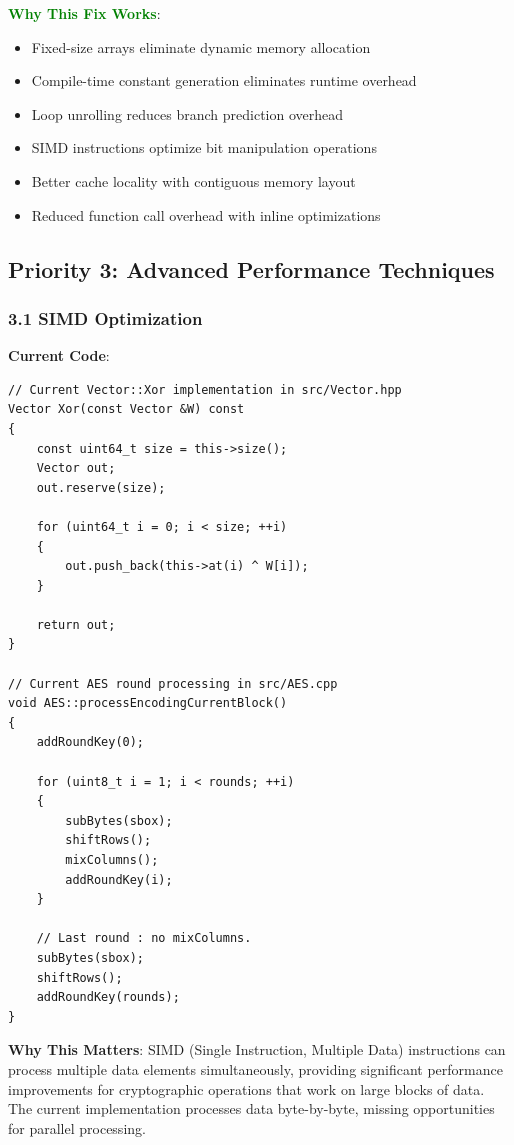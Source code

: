 \documentclass[11pt,a4paper]{article}
\begin{document}
\textcolor{green}{\textbf{Why This Fix Works}}:
\begin{itemize}
    \item Fixed-size arrays eliminate dynamic memory allocation
    \item Compile-time constant generation eliminates runtime overhead
    \item Loop unrolling reduces branch prediction overhead
    \item SIMD instructions optimize bit manipulation operations
    \item Better cache locality with contiguous memory layout
    \item Reduced function call overhead with inline optimizations
\end{itemize}

\subsection{Priority 3: Advanced Performance Techniques}

\subsubsection{3.1 SIMD Optimization}

\textbf{Current Code}:
\begin{lstlisting}
// Current Vector::Xor implementation in src/Vector.hpp
Vector Xor(const Vector &W) const
{
    const uint64_t size = this->size();
    Vector out;
    out.reserve(size);

    for (uint64_t i = 0; i < size; ++i)
    {
        out.push_back(this->at(i) ^ W[i]);
    }

    return out;
}

// Current AES round processing in src/AES.cpp
void AES::processEncodingCurrentBlock()
{
    addRoundKey(0);

    for (uint8_t i = 1; i < rounds; ++i)
    {
        subBytes(sbox);
        shiftRows();
        mixColumns();
        addRoundKey(i);
    }

    // Last round : no mixColumns.
    subBytes(sbox);
    shiftRows();
    addRoundKey(rounds);
}
\end{lstlisting}

\textbf{Why This Matters}: SIMD (Single Instruction, Multiple Data) instructions can process multiple data elements simultaneously, providing significant performance improvements for cryptographic operations that work on large blocks of data. The current implementation processes data byte-by-byte, missing opportunities for parallel processing.
\end{document}
